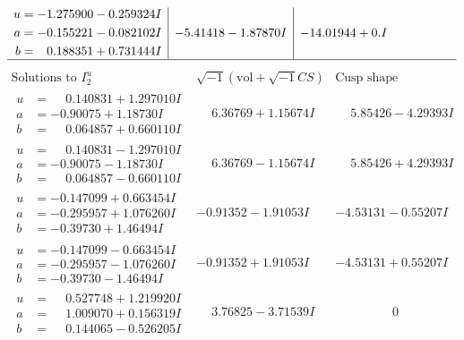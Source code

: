 \documentclass[1p]{elsarticle_modified}
\theoremstyle{definition}
\newcommand{\I}{\sqrt{-1}}
\begin{document}
$$\begin{array}{c|c|c}
\begin{aligned}
u &= -1.275900 - 0.259324 I \\
a &= -0.155221 - 0.082102 I \\
b &= \phantom{-}0.188351 + 0.731444 I\end{aligned}
 & -5.41418 - 1.87870 I & -14.01944 + 0. I\phantom{ +0.000000I}\\
 \hline 
 \end{array}$$\newpage$$\begin{array}{c|c|c}  
\text{Solutions to }I^u_{2}& \I (\text{vol} + \sqrt{-1}CS) & \text{Cusp shape}\\
 \hline 
\begin{aligned}
u &= \phantom{-}0.140831 + 1.297010 I \\
a &= -0.90075 + 1.18730 I \\
b &= \phantom{-}0.064857 + 0.660110 I\end{aligned}
 & \phantom{-}6.36769 + 1.15674 I & \phantom{-}5.85426 - 4.29393 I \\ \hline\begin{aligned}
u &= \phantom{-}0.140831 - 1.297010 I \\
a &= -0.90075 - 1.18730 I \\
b &= \phantom{-}0.064857 - 0.660110 I\end{aligned}
 & \phantom{-}6.36769 - 1.15674 I & \phantom{-}5.85426 + 4.29393 I \\ \hline\begin{aligned}
u &= -0.147099 + 0.663454 I \\
a &= -0.295957 + 1.076260 I \\
b &= -0.39730 + 1.46494 I\end{aligned}
 & -0.91352 - 1.91053 I & -4.53131 - 0.55207 I \\ \hline\begin{aligned}
u &= -0.147099 - 0.663454 I \\
a &= -0.295957 - 1.076260 I \\
b &= -0.39730 - 1.46494 I\end{aligned}
 & -0.91352 + 1.91053 I & -4.53131 + 0.55207 I \\ \hline\begin{aligned}
u &= \phantom{-}0.527748 + 1.219920 I \\
a &= \phantom{-}1.009070 + 0.156319 I \\
b &= \phantom{-}0.144065 - 0.526205 I\end{aligned}
 & \phantom{-}3.76825 - 3.71539 I & \phantom{-0.000000 } 0 \\ \hline\begin{aligned}

\end{aligned}
\end{array}$$
\end{document}
